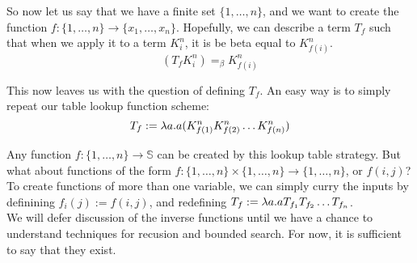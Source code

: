 So now let us say that we have a finite set $\{1,\ldots,n\}$, and we want to create the function $f:\{1,\ldots,n\} \rightarrow \{x_1,\ldots,x_n\}$. Hopefully, we can describe a term $T_f$ such that when we apply it to a term $K_i^n$, it is be beta equal to $K_{f(i)}^n$.
\begin{equation*}
  (T_fK_i^n) =_\beta K_{f(i)}^n
\end{equation*}

This now leaves us with the question of defining $T_f$. An easy way is to simply repeat our table lookup function scheme:
\begin{equation*}
  T_f := \lambda a.a(K_{f(1)}^nK_{f(2)}^n\ldots K_{f(n)}^n)
\end{equation*}


Any function $f:\{1,\ldots,n\} \rightarrow \mathbb{S}$ can be created by this lookup table strategy. But what about functions of the form $f : \{1,\ldots,n\} \times \{1,\ldots,n\} \rightarrow \{1,\ldots,n\}$, or $f(i,j)$? To create functions of more than one variable, we can simply curry the inputs by definining $f_i(j) := f(i,j)$, and redefining $T_f := \lambda a.aT_{f_1}T_{f_2}\ldots T_{f_n}$.\\

We will defer discussion of the inverse functions until we have a chance to understand techniques for recusion and bounded search. For now, it is sufficient to say that they exist.
